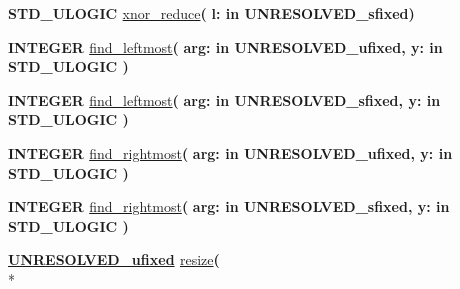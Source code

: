 \begin{DoxyCompactItemize}
\item 
{\bfseries {\bfseries \textcolor{comment}{S\+T\+D\+\_\+\+U\+L\+O\+G\+I\+C}\textcolor{vhdlchar}{ }}} \hyperlink{classfixed__pkg_ab6ceee79204a420850ad9e7876dc0ec4}{xnor\+\_\+reduce}{\bfseries  ( }{\bfseries \textcolor{vhdlchar}{l\+: }\textcolor{stringliteral}{in }\textcolor{vhdlchar}{U\+N\+R\+E\+S\+O\+L\+V\+E\+D\+\_\+sfixed}}{\bfseries  )} 
\item 
{\bfseries {\bfseries \textcolor{comment}{I\+N\+T\+E\+G\+E\+R}\textcolor{vhdlchar}{ }}} \hyperlink{classfixed__pkg_a0dfcc29be0080b3406b8147cbcff18a6}{find\+\_\+leftmost}{\bfseries  ( }{\bfseries \textcolor{vhdlchar}{arg\+: }\textcolor{stringliteral}{in }\textcolor{vhdlchar}{U\+N\+R\+E\+S\+O\+L\+V\+E\+D\+\_\+ufixed}}{\bfseries  , \textcolor{vhdlchar}{y\+: }\textcolor{stringliteral}{in }{\bfseries \textcolor{comment}{S\+T\+D\+\_\+\+U\+L\+O\+G\+I\+C}\textcolor{vhdlchar}{ }}}{\bfseries  )} 
\item 
{\bfseries {\bfseries \textcolor{comment}{I\+N\+T\+E\+G\+E\+R}\textcolor{vhdlchar}{ }}} \hyperlink{classfixed__pkg_a0dfcc29be0080b3406b8147cbcff18a6}{find\+\_\+leftmost}{\bfseries  ( }{\bfseries \textcolor{vhdlchar}{arg\+: }\textcolor{stringliteral}{in }\textcolor{vhdlchar}{U\+N\+R\+E\+S\+O\+L\+V\+E\+D\+\_\+sfixed}}{\bfseries  , \textcolor{vhdlchar}{y\+: }\textcolor{stringliteral}{in }{\bfseries \textcolor{comment}{S\+T\+D\+\_\+\+U\+L\+O\+G\+I\+C}\textcolor{vhdlchar}{ }}}{\bfseries  )} 
\item 
{\bfseries {\bfseries \textcolor{comment}{I\+N\+T\+E\+G\+E\+R}\textcolor{vhdlchar}{ }}} \hyperlink{classfixed__pkg_a5993175faa64790646b397a112b9124a}{find\+\_\+rightmost}{\bfseries  ( }{\bfseries \textcolor{vhdlchar}{arg\+: }\textcolor{stringliteral}{in }\textcolor{vhdlchar}{U\+N\+R\+E\+S\+O\+L\+V\+E\+D\+\_\+ufixed}}{\bfseries  , \textcolor{vhdlchar}{y\+: }\textcolor{stringliteral}{in }{\bfseries \textcolor{comment}{S\+T\+D\+\_\+\+U\+L\+O\+G\+I\+C}\textcolor{vhdlchar}{ }}}{\bfseries  )} 
\item 
{\bfseries {\bfseries \textcolor{comment}{I\+N\+T\+E\+G\+E\+R}\textcolor{vhdlchar}{ }}} \hyperlink{classfixed__pkg_a5993175faa64790646b397a112b9124a}{find\+\_\+rightmost}{\bfseries  ( }{\bfseries \textcolor{vhdlchar}{arg\+: }\textcolor{stringliteral}{in }\textcolor{vhdlchar}{U\+N\+R\+E\+S\+O\+L\+V\+E\+D\+\_\+sfixed}}{\bfseries  , \textcolor{vhdlchar}{y\+: }\textcolor{stringliteral}{in }{\bfseries \textcolor{comment}{S\+T\+D\+\_\+\+U\+L\+O\+G\+I\+C}\textcolor{vhdlchar}{ }}}{\bfseries  )} 
\item 
{\bfseries {\bfseries {\bfseries \hyperlink{classfixed__pkg_ae78bc2b36d22f6abeac163955e8a587d}{U\+N\+R\+E\+S\+O\+L\+V\+E\+D\+\_\+ufixed}} \textcolor{vhdlchar}{ }}} \hyperlink{classfixed__pkg_abf2f374584cfbfe89412617938b9014a}{resize}{\bfseries  ( }\\*

\end{DoxyCompactItemize}
